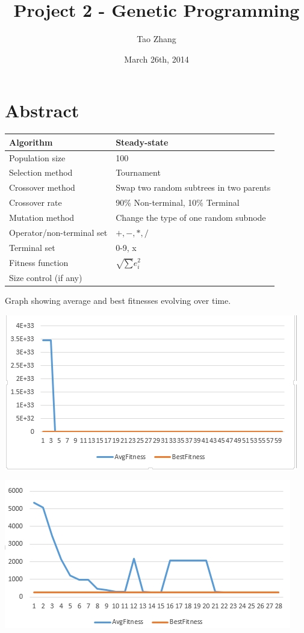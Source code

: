 \documentclass[11pt]{article} %
\title{Project 2 - Genetic Programming}
\author{Tao Zhang}
\date{March 26th, 2014} %
\begin{document}
\maketitle

\section{Abstract}

\begin{tabular}{|l|p{4in}|}
\hline
Algorithm &  Steady-state\\
\hline
Population size & 100\\
\hline
Selection method & Tournament\\
\hline
Crossover method & Swap two random subtrees in two parents\\ 
\hline
Crossover rate & 90\% Non-terminal, 10\% Terminal\\
\hline
Mutation method & Change the type of one random subnode\\
\hline
Operator/non-terminal set & ${+, -, *, /}$\\
\hline
Terminal set & 0-9, x\\
\hline
Fitness function & $\surd \sum e^2_i$\\
\hline
Size control (if any) & \\
\hline
\end{tabular}


\newpage
Graph showing average and best fitnesses evolving over time. 

\includegraphics[scale=.7]{First60.jpg}

\includegraphics[scale=.7]{60to90.jpg}
\end{document}
